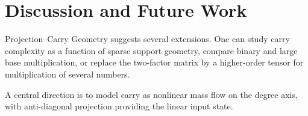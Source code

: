 \section{Discussion and Future Work}

Projection--Carry Geometry suggests several extensions. One can study carry
complexity as a function of sparse support geometry, compare binary and large
base multiplication, or replace the two-factor matrix by a higher-order tensor
for multiplication of several numbers.

A central direction is to model carry as nonlinear mass flow on the degree
axis, with anti-diagonal projection providing the linear input state.
